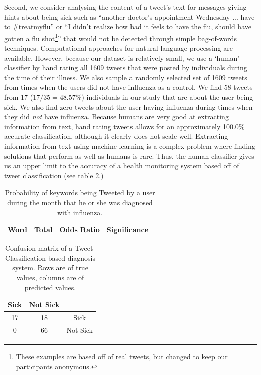 \documentclass{acm_proc_article-sp}
\begin{document}
Second, we consider analysing the content of a tweet's text for messages giving hints about being sick such as ``another doctor's appointment Wednesday ... have to \#treatmyflu'' or ``I didn't realize how bad it feels to have the flu, should have gotten a flu shot\footnote{These examples are based off of real tweets, but changed to keep our participants anonymous.}'' that would not be detected through simple bag-of-words techniques. Computational approaches for natural language processing are available. However, because our dataset is relatively small, we use a `human' classifier by hand rating all 1609 tweets that were posted by individuals during the time of their illness. We also sample a randomly selected set of 1609 tweets from times when the users did not have influenza as a control. We find 58 tweets from 17 (\(17/35 = 48.57\%\))  individuals in our study that are about the user being sick. We also find zero tweets about the user having influenza during times when they did \emph{not} have influenza. Because humans are very good at extracting information from text, hand rating tweets allows for an approximately 100.0\% accurate classification, although it clearly does not scale well. Extracting information from text using machine learning is a complex problem where finding solutions that perform as well as humans is rare. Thus, the human classifier gives us an upper limit to the accuracy of a health monitoring system based off of tweet classification (see table \ref{tab:tweet_classified_confusion}.)


%

\begin{table}
\centering
\begin{tabular}{|c|c|c|c|} \hline
Word& Total &Odds Ratio & Significance\ \\ \hline

\end{tabular}
\caption{Probability of keywords being Tweeted by a user during the month that he or she was diagnosed with influenza.}
\label{tab:tweet_keyword_expert_results}
\end{table}


\begin{table}
\centering
\begin{tabular}{|c|c|c|} \hline
Sick&Not Sick&\ \\ \hline
17 & 18 & Sick\\ \hline
0 & 66  & Not Sick\\
\hline\end{tabular}
\caption{Confusion matrix of a Tweet-Classification based diagnosis system. Rows are of true values, columns are of predicted values.}
\label{tab:tweet_classified_confusion}
\end{table}
\end{document}

